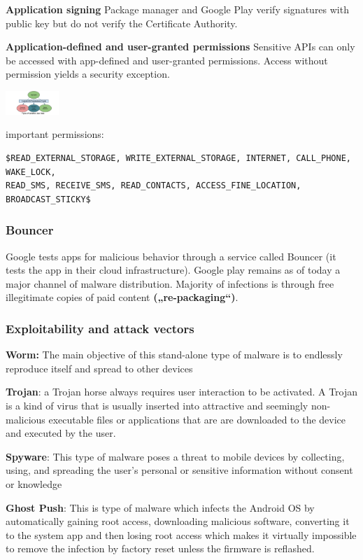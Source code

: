 \textbf{Application signing}
Package manager and Google Play verify signatures with public key but do not
verify the Certificate Authority.

\textbf{Application-defined and user-granted permissions}
Sensitive APIs can only be accessed with app-defined and user-granted
permissions. Access without permission yields a security exception.

\includegraphics[width=0.15\textwidth]{android/permission_types.png}

important permissions:
\begin{lstlisting}
$READ_EXTERNAL_STORAGE, WRITE_EXTERNAL_STORAGE, INTERNET, CALL_PHONE, WAKE_LOCK,
READ_SMS, RECEIVE_SMS, READ_CONTACTS, ACCESS_FINE_LOCATION, BROADCAST_STICKY$
\end{lstlisting}

\subsubsection{Bouncer}
Google tests apps for malicious behavior through a service called Bouncer (it
tests the app in their cloud infrastructure). Google play remains as of today a
major channel of malware distribution. Majority of infections is through free
illegitimate copies of paid content \textbf{(„re-packaging“)}.

\subsubsection{Exploitability and attack vectors}
\textbf{Worm:} The main objective of this stand-alone type of malware is to endlessly
reproduce itself and spread to other devices

\textbf{Trojan}: a Trojan horse always requires user interaction to be
activated. A Trojan is a kind of virus that is usually inserted into attractive
and seemingly non-malicious executable files or applications that are are
downloaded to the device and executed by the user.

\textbf{Spyware}: This type of malware poses a threat to mobile devices by
collecting, using, and spreading the user's personal or sensitive information
without consent or knowledge

\textbf{Ghost Push}: This is type of malware which infects the Android OS by
automatically gaining root access, downloading malicious software, converting
it to the system app and then losing root access which makes it virtually
impossible to remove the infection by factory reset unless the firmware is
reflashed.

